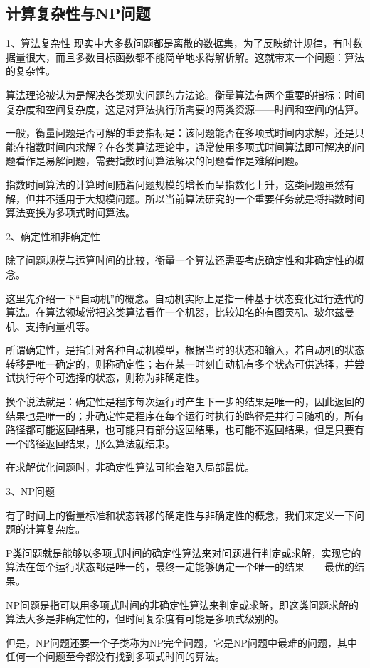 \documentclass[11pt]{book}
\newcounter{#2}
\newcounter{#2}[#1]
\numberwithin{#2}{#1}
\begin{document}
\subsection{计算复杂性与NP问题}

1、算法复杂性
现实中大多数问题都是离散的数据集，为了反映统计规律，有时数据量很大，而且多数目标函数都不能简单地求得解析解。这就带来一个问题：算法的复杂性。

算法理论被认为是解决各类现实问题的方法论。衡量算法有两个重要的指标：时间复杂度和空间复杂度，这是对算法执行所需要的两类资源——时间和空间的估算。

一般，衡量问题是否可解的重要指标是：该问题能否在多项式时间内求解，还是只能在指数时间内求解？在各类算法理论中，通常使用多项式时间算法即可解决的问题看作是易解问题，需要指数时间算法解决的问题看作是难解问题。

指数时间算法的计算时间随着问题规模的增长而呈指数化上升，这类问题虽然有解，但并不适用于大规模问题。所以当前算法研究的一个重要任务就是将指数时间算法变换为多项式时间算法。

2、确定性和非确定性 

除了问题规模与运算时间的比较，衡量一个算法还需要考虑确定性和非确定性的概念。

这里先介绍一下“自动机”的概念。自动机实际上是指一种基于状态变化进行迭代的算法。在算法领域常把这类算法看作一个机器，比较知名的有图灵机、玻尔兹曼机、支持向量机等。

所谓确定性，是指针对各种自动机模型，根据当时的状态和输入，若自动机的状态转移是唯一确定的，则称确定性；若在某一时刻自动机有多个状态可供选择，并尝试执行每个可选择的状态，则称为非确定性。

换个说法就是：确定性是程序每次运行时产生下一步的结果是唯一的，因此返回的结果也是唯一的；非确定性是程序在每个运行时执行的路径是并行且随机的，所有路径都可能返回结果，也可能只有部分返回结果，也可能不返回结果，但是只要有一个路径返回结果，那么算法就结束。

在求解优化问题时，非确定性算法可能会陷入局部最优。

3、NP问题

有了时间上的衡量标准和状态转移的确定性与非确定性的概念，我们来定义一下问题的计算复杂度。

P类问题就是能够以多项式时间的确定性算法来对问题进行判定或求解，实现它的算法在每个运行状态都是唯一的，最终一定能够确定一个唯一的结果——最优的结果。

NP问题是指可以用多项式时间的非确定性算法来判定或求解，即这类问题求解的算法大多是非确定性的，但时间复杂度有可能是多项式级别的。

但是，NP问题还要一个子类称为NP完全问题，它是NP问题中最难的问题，其中任何一个问题至今都没有找到多项式时间的算法。
\end{document}
